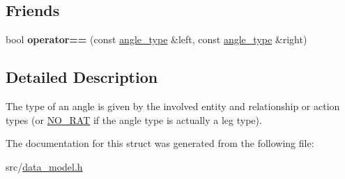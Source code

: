 \subsection*{Friends}
\begin{DoxyCompactItemize}
\item 
\mbox{\label{structtricl_1_1angle__type_a259cbf4e32421b1e65066025fa86e999}} 
bool {\bfseries operator==} (const \hyperlink{structtricl_1_1angle__type}{angle\+\_\+type} \&left, const \hyperlink{structtricl_1_1angle__type}{angle\+\_\+type} \&right)
\end{DoxyCompactItemize}


\subsection{Detailed Description}
The type of an angle is given by the involved entity and relationship or action types (or \hyperlink{data__model_8h_ae71ff63a5bdb6bfc09a18840c8df4e54}{N\+O\+\_\+\+R\+AT} if the angle type is actually a leg type). 

The documentation for this struct was generated from the following file\+:\begin{DoxyCompactItemize}
\item 
src/\hyperlink{data__model_8h}{data\+\_\+model.\+h}\end{DoxyCompactItemize}

